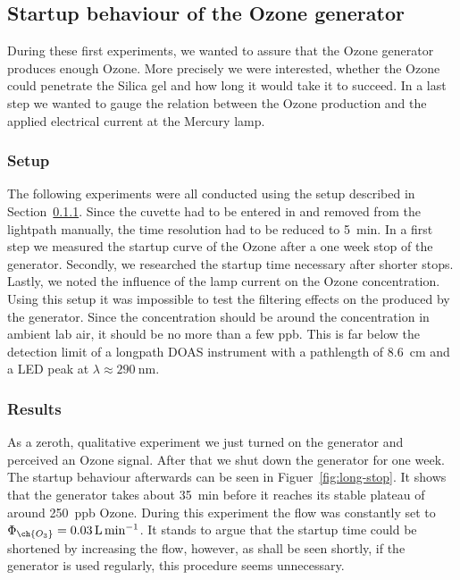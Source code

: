 \subsection{Startup behaviour of the Ozone generator}
\label{sec:ozone}

During these first experiments, we wanted to assure that the Ozone
generator produces enough Ozone. More precisely we were interested,
whether the Ozone could penetrate the Silica gel and how long it would
take it to succeed. In a last step we wanted to gauge the relation
between the Ozone production and the applied electrical current at the
Mercury lamp.

\subsubsection{Setup}
\label{sec:ozone-setup}

The following experiments were all conducted using the setup described
in Section~\ref{sec:ozone-setup}. Since the cuvette had to be entered
in and removed from the lightpath manually, the time resolution had to
be reduced to \SI{5}{\minute}. In a first step we measured the startup
curve of the Ozone after a one week stop of the generator. Secondly, we
researched the startup time necessary after shorter stops. Lastly, we
noted the influence of the lamp current on the Ozone concentration.
Using this setup it was impossible to test the filtering effects on
the  produced by the generator. Since the concentration should
be around the  concentration in ambient lab air, it should be
no more than a few \si{ppb}. This is far below the detection limit of
a longpath DOAS instrument with a pathlength of
\SI{8.6}{\centi\meter} and a LED peak at $\lambda \approx
\SI{290}{\nano\meter}$.

\subsubsection{Results}
\label{sec:ozone-results}

As a zeroth, qualitative experiment we just turned on the generator
and perceived an Ozone signal. After that we shut down the generator
for one week. The startup behaviour afterwards can be seen in
Figuer~\ref{fig:long-stop}. It shows that the generator takes about
\SI{35}{\minute} before it reaches its stable plateau of around
\SI{250}{ppb} Ozone. During this experiment the flow was constantly
set to $\Phi_{\ch{O_3}} = \SI{0.03}{\liter\per\minute}$. It stands to
argue that the startup time could be shortened by increasing the flow,
however, as shall be seen shortly, if the
generator is used regularly, this procedure seems unnecessary.

